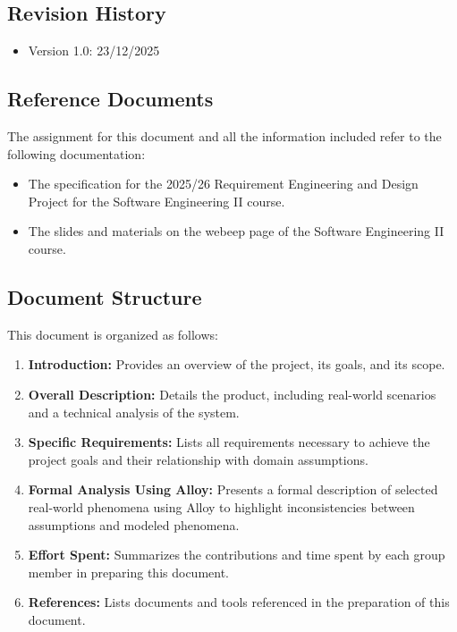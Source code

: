 \subsection{Revision History}
\begin{itemize}
	\item Version 1.0: 23/12/2025
\end{itemize}

\subsection{Reference Documents}
The assignment for this document and all the information included refer to the following documentation:
\begin{itemize}
	\item The specification for the 2025/26 Requirement Engineering and Design Project for the Software Engineering II course.
	\item The slides and materials on the webeep page of the Software Engineering II course.
\end{itemize}

\subsection{Document Structure}
This document is organized as follows:
\begin{enumerate}
	\item \textbf{Introduction:} Provides an overview of the project, its goals, and its scope.
	\item \textbf{Overall Description:} Details the product, including real-world scenarios and a technical analysis of the system.
	\item \textbf{Specific Requirements:} Lists all requirements necessary to achieve the project goals and their relationship with domain assumptions.
	\item \textbf{Formal Analysis Using Alloy:} Presents a formal description of selected real-world phenomena using Alloy to highlight inconsistencies between assumptions and modeled phenomena.
	\item \textbf{Effort Spent:} Summarizes the contributions and time spent by each group member in preparing this document.
	\item \textbf{References:} Lists documents and tools referenced in the preparation of this document.
\end{enumerate}
















